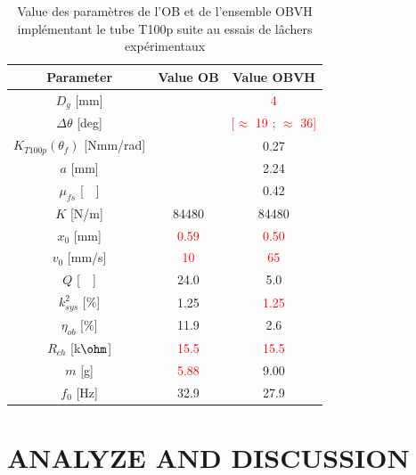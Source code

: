 \documentclass[3p,twocolumn,preprint]{elsarticle}
\begin{document}
\begin{table}[!htbp]
	\centering
		\begin{tabular}[t]{c|c|c}
\toprule
\multicolumn{1}{c}{\textbf{Parameter}}	&
\multicolumn{1}{c}{\textbf{Value OB}} 	& 
\multicolumn{1}{c}{\textbf{Value OBVH}}  \\
\midrule
$D_g$ [mm] 						& \cellcolor{ashgrey} 		& \textcolor{red}{4} 		\\ \hline
$\Delta\theta$ [deg] 			& \cellcolor{ashgrey} 		& \textcolor{red}{{[$\approx$ 19 ; $\approx$ 36]}} \\ \hline
$K_{T100p}(\theta_f)$ [Nmm/rad] & \cellcolor{ashgrey}  		&  0.27 					\\ \hline
$a$ [mm]         			    & \cellcolor{ashgrey}  		&  2.24				 	 	\\ \hline
$\mu_{fs}$ [~~] 				& \cellcolor{ashgrey}  		&  0.42  					\\ \hline
$K$ [N/m] 						&	84480			  	 	&  84480  					\\ \hline
$x_0$ [mm] 						& \textcolor{red}{0.59}		& \textcolor{red}{0.50}  	\\ \hline
$v_0$ [mm/s] 					& \textcolor{red}{10}		& \textcolor{red}{65}  		\\ \hline
$Q$	[~~] 						& 		24.0		 		& 5.0     					\\ \hline
$k^2_{sys}$ [\%] 				& 		1.25		 		& \textcolor{red}{1.25}   	\\ \hline
$\eta_{ob}$ [\%] 				& 		11.9		 		& 2.6   					\\ \hline	
$R_{ch}$ [k$\text{\ohm}$] 		&	\textcolor{red}{15.5}	& \textcolor{red}{15.5}    	\\ \hline		
$m$	[g]						    &	\textcolor{red}{5.88}	& 9.00   					\\ \hline	
$f_0$ [Hz]						&		32.9				& 27.9   					\\
\bottomrule	
	\end{tabular}
        \caption{Value des paramètres de l'OB et de l'ensemble OBVH implémentant le tube T100p suite au essais de lâchers expérimentaux}
        \label{tab:parametres lacher tube}
\end{table}        

\section{ANALYZE AND DISCUSSION}
\label{sec:ANALYZE AND DISCUSSION}
\end{document}
